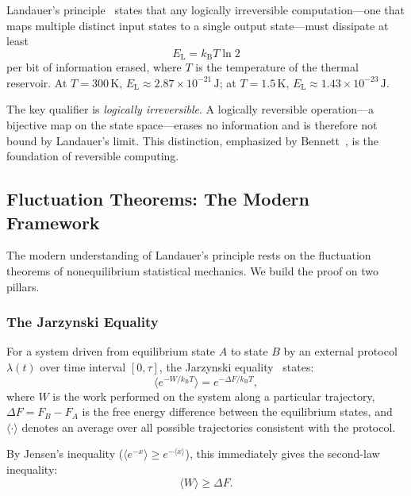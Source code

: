 \documentclass[11pt,twocolumn]{article}
\theoremstyle{definition}
\theoremstyle{remark}
\newcommand{\kB}{k_{\mathrm{B}}}
\newcommand{\EL}{E_{\mathrm{L}}}
\begin{document}
Landauer's principle~\cite{Landauer1961} states that any logically
irreversible computation---one that maps multiple distinct input states
to a single output state---must dissipate at least
\begin{equation}
\EL = \kB T \ln 2
\label{eq:landauer_bound}
\end{equation}
per bit of information erased, where $T$ is the temperature of the
thermal reservoir. At $T = 300\,\mathrm{K}$, $\EL \approx 2.87 \times
10^{-21}\,\mathrm{J}$; at $T = 1.5\,\mathrm{K}$, $\EL \approx 1.43
\times 10^{-23}\,\mathrm{J}$.

The key qualifier is \emph{logically irreversible}. A logically
reversible operation---a bijective map on the state space---erases no
information and is therefore not bound by Landauer's limit. This
distinction, emphasized by Bennett~\cite{Bennett1973,Bennett1982}, is
the foundation of reversible computing.

\subsection{Fluctuation Theorems: The Modern Framework}\label{sec:fluctuation}

The modern understanding of Landauer's principle rests on the
fluctuation theorems of nonequilibrium statistical mechanics. We build
the proof on two pillars.

\subsubsection{The Jarzynski Equality}

For a system driven from equilibrium state $A$ to state $B$ by an
external protocol $\lambda(t)$ over time interval $[0,\tau]$, the
Jarzynski equality~\cite{Jarzynski1997} states:
\begin{equation}
\langle e^{-W/\kB T}\rangle = e^{-\Delta F/\kB T},
\label{eq:jarzynski}
\end{equation}
where $W$ is the work performed on the system along a particular
trajectory, $\Delta F = F_B - F_A$ is the free energy difference between
the equilibrium states, and $\langle\cdot\rangle$ denotes an average
over all possible trajectories consistent with the protocol.

By Jensen's inequality ($\langle e^{-x}\rangle \geq e^{-\langle
x\rangle}$), this immediately gives the second-law inequality:
\begin{equation}
\langle W\rangle \geq \Delta F.
\label{eq:second_law}
\end{equation}
\end{document}
